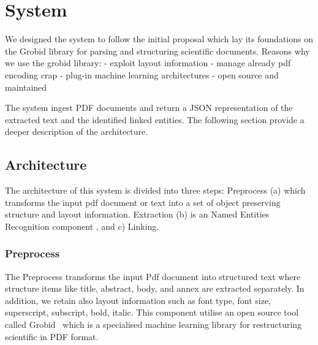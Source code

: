 \documentclass{article}
\begin{document}




\section{System}

We designed the system to follow the initial proposal \cite{foppiano:hal-02870896} which lay its foundations on the Grobid library for parsing and structuring scientific documents.
Reasons why we use the grobid library: 
 - exploit layout information
 - manage already pdf encoding crap 
 - plug-in machine learning architectures 
 - open source and maintained 
 
The system ingest PDF documents and return a JSON representation of the extracted text and the identified linked entities. 
The following section provide a deeper description of the architecture. 

\subsection{Architecture}

The architecture of this system is divided into three steps: Preprocess (a) which transforms the input pdf document or text into a set of object preserving structure and layout information. Extraction (b) is an Named Entities Recognition component , and c) Linking.


\subsubsection{Preprocess}
The Preprocess transforms the input Pdf document into structured text where structure items like title, abstract, body, and annex are extracted separately. In addition, we retain also layout information such as font type, font size, superscript, subscript, bold, italic. 
This component utilise an open source tool called Grobid~\cite{GROBID} which is a specialised machine learning library for restructuring scientific in PDF format. 
\end{document}
